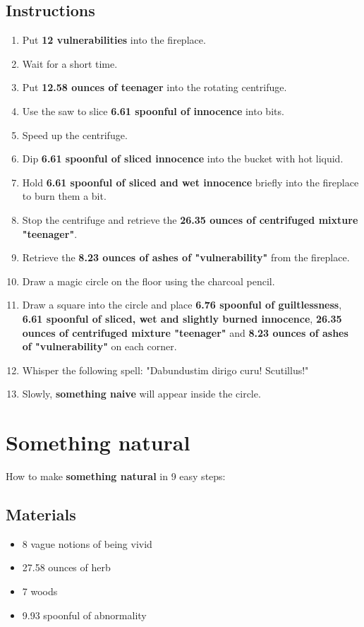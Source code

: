 \documentclass{article}
\begin{document}
\subsection{Instructions}\begin{enumerate}
\item 
Put \textbf{12 vulnerabilities} into the fireplace.
\item 
Wait for a short time.
\item 
Put \textbf{12.58 ounces of teenager} into the rotating centrifuge.
\item 
Use the saw to slice \textbf{6.61 spoonful of innocence} into bits.
\item 
Speed up the centrifuge.
\item 
Dip \textbf{6.61 spoonful of sliced innocence} into the bucket with hot liquid.
\item 
Hold \textbf{6.61 spoonful of sliced and wet innocence} briefly into the fireplace to burn them a bit.
\item 
Stop the centrifuge and retrieve the \textbf{26.35 ounces of centrifuged mixture "teenager"}.
\item 
Retrieve the \textbf{8.23 ounces of ashes of "vulnerability"} from the fireplace.
\item 
Draw a magic circle on the floor using the charcoal pencil.
\item 
Draw a square into the circle and place \textbf{6.76 spoonful of guiltlessness}, \textbf{6.61 spoonful of sliced, wet and slightly burned innocence}, \textbf{26.35 ounces of centrifuged mixture "teenager"} and \textbf{8.23 ounces of ashes of "vulnerability"} on each corner.
\item 
Whisper the following spell: "Dabundustim dirigo curu! Scutillus!"
\item 
Slowly, \textbf{something naive} will appear inside the circle.
\end{enumerate}
\newpage
\section{Something natural}How to make \textbf{something natural} in 9 easy steps:

\subsection{Materials}\begin{itemize}
\item 
8 vague notions of being vivid
\item 
27.58 ounces of herb
\item 
7 woods
\item 
9.93 spoonful of abnormality
\end{itemize}
\end{document}

